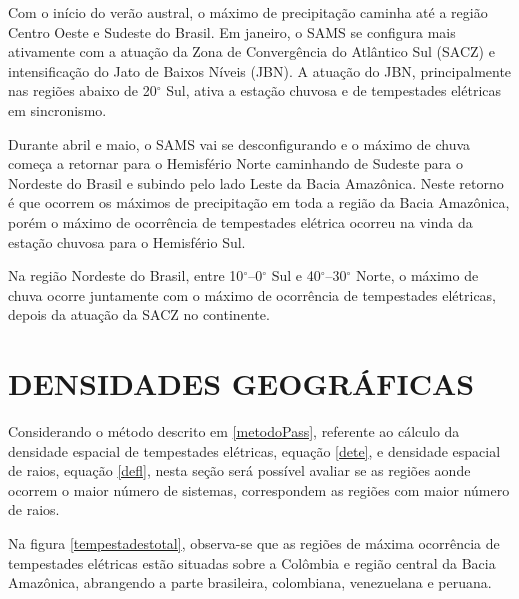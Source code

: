 Com o início do verão austral, o máximo de precipitação caminha até a região Centro Oeste e Sudeste do Brasil. Em janeiro, o SAMS se configura mais ativamente com a atuação da Zona de Convergência do Atlântico Sul (SACZ)  e intensificação do Jato de Baixos Níveis (JBN).  A atuação do JBN, principalmente nas regiões abaixo de 20$^{\circ}$ Sul, ativa a estação chuvosa e de tempestades elétricas em sincronismo. 

Durante abril e maio, o SAMS vai se desconfigurando e o máximo de chuva começa a retornar para o Hemisfério Norte caminhando de Sudeste para o Nordeste do Brasil e subindo pelo lado Leste da Bacia Amazônica. Neste retorno é que ocorrem os máximos de precipitação em toda a região da Bacia Amazônica, porém o máximo de ocorrência de tempestades elétrica ocorreu na vinda da estação chuvosa para o Hemisfério Sul.

Na região Nordeste do Brasil, entre 10$^{\circ}$--0$^{\circ}$ Sul e 40$^{\circ}$--30$^{\circ}$ Norte, o máximo de chuva ocorre juntamente com o máximo de ocorrência de tempestades elétricas, depois da atuação da SACZ no continente.


\section{DENSIDADES GEOGRÁFICAS}
\label{secaoDensidades}

Considerando o método descrito em \ref{metodoPass}, referente ao cálculo da densidade espacial de tempestades elétricas, equação \ref{dete}, e densidade espacial de raios, equação \ref{defl}, nesta seção será possível avaliar se as regiões aonde ocorrem o maior número de sistemas, correspondem as regiões com maior número de raios.

Na figura \ref{tempestadestotal}, observa-se que as regiões de máxima ocorrência de tempestades elétricas estão situadas sobre a Colômbia e região central da Bacia Amazônica, abrangendo a parte brasileira, colombiana, venezuelana e peruana.


